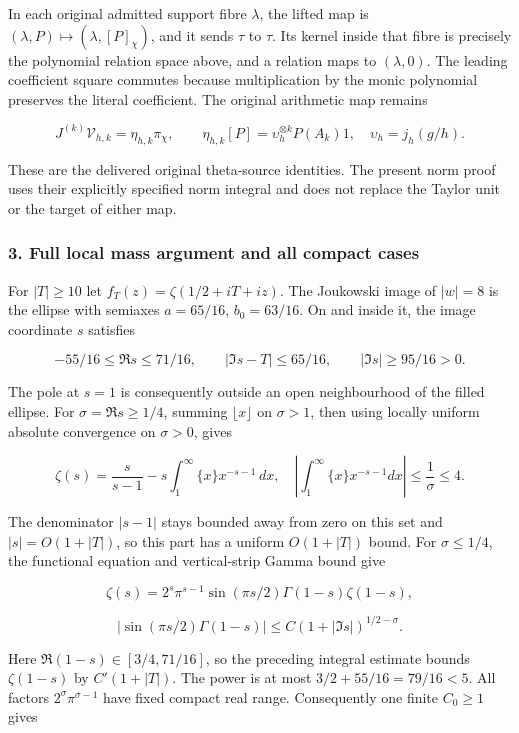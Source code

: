 In each original admitted support fibre \(\lambda\), the lifted map is \((\lambda,P)\mapsto(\lambda,[P]_\chi)\), and it sends \(\tau\) to \(\tau\). Its kernel inside that fibre is precisely the polynomial relation space above, and a relation maps to \((\lambda,0)\). The leading coefficient square commutes because multiplication by the monic polynomial preserves the literal coefficient. The original arithmetic map remains

\[
J^{(k)}\mathcal V_{h,k}=\eta_{h,k}\pi_\chi,\qquad
\eta_{h,k}[P]=\upsilon_h^{\otimes k}P(A_k)1,
\quad \upsilon_h=j_h(g/h).
\]

These are the delivered original theta-source identities. The present norm proof uses their explicitly specified norm integral and does not replace the Taylor unit or the target of either map.

\subsubsection{3. Full local mass argument and all compact cases}\label{endpoint-arithmetic_intake--full-local-mass-argument-and-all-compact-cases}

For \(|T|\ge10\) let \(f_T(z)=\zeta(1/2+iT+iz)\). The Joukowski image of \(|w|=8\) is the ellipse with semiaxes \(a=65/16\), \(b_0=63/16\). On and inside it, the image coordinate \(s\) satisfies

\[
-55/16\le\Re s\le71/16,\qquad
|\Im s-T|\le65/16,\qquad |\Im s|\ge95/16>0.
\]

The pole at \(s=1\) is consequently outside an open neighbourhood of the filled ellipse. For \(\sigma=\Re s\ge1/4\), summing \(\lfloor x\rfloor\) on \(\sigma>1\), then using locally uniform absolute convergence on \(\sigma>0\), gives

\[
\zeta(s)=\frac{s}{s-1}-s\int_1^\infty\{x\}x^{-s-1}\,dx,
\quad \left|\int_1^\infty\{x\}x^{-s-1}dx\right|\le\frac1\sigma\le4.
\]

The denominator \(|s-1|\) stays bounded away from zero on this set and \(|s|=O(1+|T|)\), so this part has a uniform \(O(1+|T|)\) bound. For \(\sigma\le1/4\), the functional equation and vertical-strip Gamma bound give

\[
\zeta(s)=2^s\pi^{s-1}\sin(\pi s/2)\Gamma(1-s)\zeta(1-s),
\]

\[
|\sin(\pi s/2)\Gamma(1-s)|
\le C(1+|\Im s|)^{1/2-\sigma}.
\]

Here \(\Re(1-s)\in[3/4,71/16]\), so the preceding integral estimate bounds \(\zeta(1-s)\) by \(C'(1+|T|)\). The power is at most \(3/2+55/16=79/16<5\). All factors \(2^\sigma\pi^{\sigma-1}\) have fixed compact real range. Consequently one finite \(C_0\ge1\) gives

